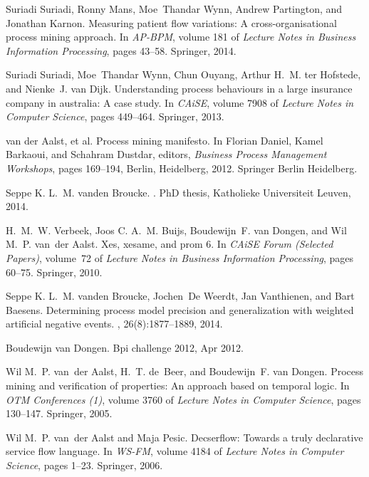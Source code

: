\documentclass[a4wide,11pt]{article}
\theoremstyle{definition}
\theoremstyle{plain}
\begin{document}
\begin{thebibliography}{MWvdAvdB06}
Suriadi Suriadi, Ronny Mans, Moe~Thandar Wynn, Andrew Partington, and Jonathan
  Karnon.
\newblock Measuring patient flow variations: {A} cross-organisational process
  mining approach.
\newblock In {\em {AP-BPM}}, volume 181 of {\em Lecture Notes in Business
  Information Processing}, pages 43--58. Springer, 2014.

Suriadi Suriadi, Moe~Thandar Wynn, Chun Ouyang, Arthur H.~M. ter Hofstede, and
  Nienke~J. van Dijk.
\newblock Understanding process behaviours in a large insurance company in
  australia: {A} case study.
\newblock In {\em CAiSE}, volume 7908 of {\em Lecture Notes in Computer
  Science}, pages 449--464. Springer, 2013.

{van der Aalst, et al.}
\newblock Process mining manifesto.
\newblock In Florian Daniel, Kamel Barkaoui, and Schahram Dustdar, editors,
  {\em Business Process Management Workshops}, pages 169--194, Berlin,
  Heidelberg, 2012. Springer Berlin Heidelberg.

Seppe K. L.~M. vanden Broucke.
.
\newblock PhD thesis, Katholieke Universiteit Leuven, 2014.

H.~M.~W. Verbeek, Joos C. A.~M. Buijs, Boudewijn~F. van Dongen, and Wil M.~P.
  van~der Aalst.
\newblock Xes, xesame, and prom 6.
\newblock In {\em CAiSE Forum (Selected Papers)}, volume~72 of {\em Lecture
  Notes in Business Information Processing}, pages 60--75. Springer, 2010.

Seppe K. L.~M. vanden Broucke, Jochen~De Weerdt, Jan Vanthienen, and Bart
  Baesens.
\newblock Determining process model precision and generalization with weighted
  artificial negative events.
, 26(8):1877--1889, 2014.

Boudewijn van Dongen.
\newblock Bpi challenge 2012, Apr 2012.

Wil M.~P. van~der Aalst, H.~T. de~Beer, and Boudewijn~F. van Dongen.
\newblock Process mining and verification of properties: An approach based on
  temporal logic.
\newblock In {\em {OTM} Conferences {(1)}}, volume 3760 of {\em Lecture Notes
  in Computer Science}, pages 130--147. Springer, 2005.

Wil M.~P. van~der Aalst and Maja Pesic.
\newblock Decserflow: Towards a truly declarative service flow language.
\newblock In {\em {WS-FM}}, volume 4184 of {\em Lecture Notes in Computer
  Science}, pages 1--23. Springer, 2006.


\end{thebibliography}
\end{document}
